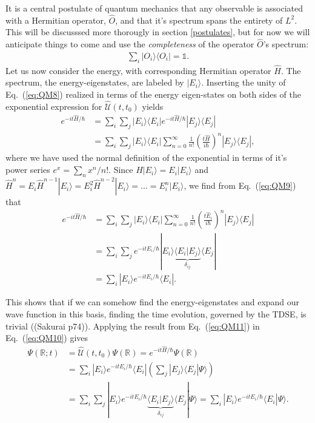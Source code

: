 \documentclass[a4paper]{article}
\newcommand{\R}{\mathbb{R}}
\newcommand{\eq} [1]{Eq.\ (\ref{eq:#1})}
\newcommand{\nn}{\nonumber}
\begin{document}
It is a central postulate of quantum mechanics that any observable is associated with a Hermitian operator, $\hat O$, and that it's spectrum spans the entirety of $L^2$. This will be discusssed more thorougly in section \ref{postulates}, but for now we will anticipate things to come and use the \emph{completeness} of the operator $\hat O$'s spectrum: 
\begin{align}
\sum_i |O_i\rangle\langle O_i| = \mathds{1}. \label{eq:QM8}
\end{align}
Let us now consider the energy, with corresponding Hermitian operator $\hat H$. The spectrum, the energy-eigenstates, are labeled by $|E_i\rangle$. Inserting the unity of \eq{QM8} realized in terms of the energy eigen-states on both sides of the exponential expression for $\hat{\mathcal{U}}(t,t_0)$ yields 
\begin{align}
e^{-it\hat H/\hbar} &= \sum_i \sum_j |E_i\rangle \langle E_i| e^{-it\hat H/\hbar} |E_j\rangle \langle E_j| \nn\\
%
&=\sum_i \sum_j |E_i\rangle \langle E_i|\sum_{n=0}^\infty \frac{1}{n!}\left(\frac{t\hat H}{i\hbar} \right)^n |E_j\rangle \langle E_j|, \label{eq:QM9}
\end{align}
where we have used the normal definition of the exponential in terms of it's power series $e^x=\sum_n x^n/n!$. Since $\hat H |E_i\rangle = E_i |E_i\rangle$ and $\hat H^n = E_i\hat H^{n-1}|E_i\rangle = E_i^2 \hat H^{n-2}|E_i\rangle = \dots = E_i^n|E_i\rangle$, we find from \eq{QM9} that 
\begin{align}
e^{-it\hat H/\hbar} &= \sum_i \sum_j |E_i\rangle \langle E_i|\sum_{n=0}^\infty \frac{1}{n!}\left(\frac{t\hat E_i}{i\hbar} \right)^n |E_j\rangle \langle E_j| \nn\\
%
&=  \sum_i \sum_j e^{-it E_i /\hbar} |E_i\rangle \underbrace{\langle E_i| E_j\rangle}_{\delta_{ij}} \langle E_j| \nn\\
%
&= \sum_i | E_i\rangle e^{-it E_i /\hbar} \langle E_i|. \label{eq:QM11}
\end{align}

This shows that if we can somehow find the energy-eigenstates and expand our wave function in this basis, finding the time evolution, governed by the TDSE, is trivial ((Sakurai p74)). Applying the result from \eq{QM11} in \eq{QM10} gives 
\begin{align}
\Psi(\R;t) &= \hat{\mathcal{U}}(t,t_0)\Psi(\R) = e^{-it\hat H/\hbar} \Psi(\R) \nn\\
%
&= \sum_i | E_i\rangle e^{-it E_i /\hbar} \langle E_i|\left(\sum_j|E_j\rangle\langle E_j|\Psi\rangle\right) \nn\\
%
&= \sum_i \sum_j| E_i\rangle e^{-it E_i /\hbar} \underbrace{\langle E_i|E_j\rangle}_{\delta_{ij}}\langle E_j|\Psi\rangle = \sum_i |E_i\rangle e^{-it E_i /\hbar} \langle E_i|\Psi\rangle.
\end{align}
\end{document}
